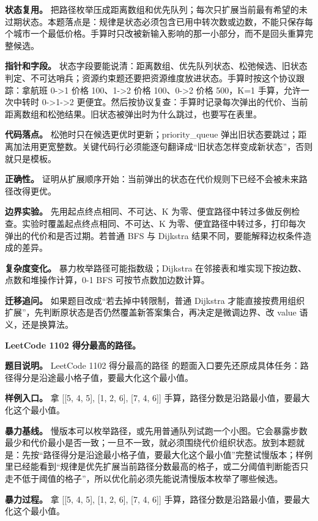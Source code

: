 \textbf{状态复用。} 把路径枚举压成距离数组和优先队列；每次只扩展当前最有希望的未过期状态。本题落点是：规律是状态必须包含已用中转次数或边数，不能只保存每个城市一个最低价格。手算时只改被新输入影响的那一小部分，而不是回头重算完整候选。

\textbf{指针和字段。} 状态字段要能说清：距离数组、优先队列状态、松弛候选、旧状态判定、不可达哨兵；资源约束题还要把资源维度放进状态。手算时按这个协议跟踪：拿航班 0->1 价格 100、1->2 价格 100、0->2 价格 500，K=1 手算，允许一次中转时 0->1->2 更便宜。然后按协议复查：手算时记录每次弹出的代价、当前距离数组和松弛结果。旧状态被弹出时为什么跳过，也要写在表里。

\textbf{代码落点。} 松弛时只在候选更优时更新；priority\_queue 弹出旧状态要跳过；距离加法用更宽整数。关键代码行必须能逐句翻译成“旧状态怎样变成新状态”，否则就只是模板。

\textbf{正确性。} 证明从扩展顺序开始：当前弹出的状态在代价规则下已经不会被未来路径改得更优。

\textbf{边界实验。} 先用起点终点相同、不可达、K 为零、便宜路径中转过多做反例检查。实验时覆盖起点终点相同、不可达、K 为零、便宜路径中转过多，打印每次弹出的代价和是否过期。若普通 BFS 与 Dijkstra 结果不同，要能解释边权条件造成的差异。

\textbf{复杂度变化。} 暴力枚举路径可能指数级；Dijkstra 在邻接表和堆实现下按边数、点数和堆操作计算，0-1 BFS 可按节点数加边数计算。

\textbf{迁移追问。} 如果题目改成“若去掉中转限制，普通 Dijkstra 才能直接按费用组织扩展”，先判断原状态是否仍然覆盖新答案集合，再决定是微调边界、改 value 语义，还是换算法。

\noindent\textbf{LeetCode 1102 得分最高的路径。}

\textbf{题目说明。} LeetCode 1102 得分最高的路径 的题面入口要先还原成具体任务：路径得分是沿途最小格子值，要最大化这个最小值。

\textbf{样例入口。} 拿 [[5, 4, 5], [1, 2, 6], [7, 4, 6]] 手算，路径分数是沿路最小值，要最大化这个最小值。

\textbf{暴力基线。} 慢版本可以枚举路径，或先用普通队列试跑一个小图。它会暴露步数最少和代价最小是否一致；一旦不一致，就必须围绕代价组织状态。放到本题就是：先按“路径得分是沿途最小格子值，要最大化这个最小值”完整试慢版本；样例里已经能看到“规律是优先扩展当前路径分数最高的格子，或二分阈值判断能否只走不低于阈值的格子”，所以优化前必须先能说清慢版本枚举了哪些候选。

\textbf{暴力过程。} 拿 [[5, 4, 5], [1, 2, 6], [7, 4, 6]] 手算，路径分数是沿路最小值，要最大化这个最小值。

